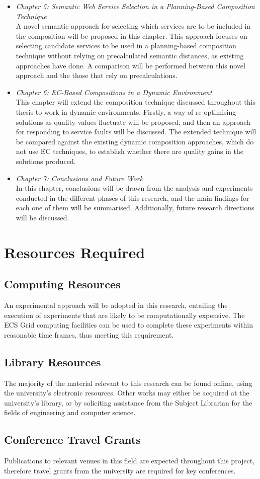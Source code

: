 \begin{itemize}
 \item \textit{Chapter 5: Semantic Web Service Selection in a Planning-Based Composition Technique}\\
 A novel semantic approach for selecting which services are to be included in the composition will be proposed in this chapter. This approach focuses on selecting candidate services to be used in a planning-based composition technique without relying on precalculated semantic distances, as existing approaches have done. A comparison will be performed between this novel approach and the those that rely on precalculations.
 \item \textit{Chapter 6: EC-Based Compositions in a Dynamic Environment}\\
 This chapter will extend the composition technique discussed throughout this thesis to work in dynamic environments. Firstly, a way of re-optimising solutions as quality values fluctuate will be proposed, and then an approach for responding to service faults will be discussed. The extended technique will be compared against the existing dynamic composition approaches, which do not use EC techniques, to establish whether there are quality gains in the solutions produced.
 \item \textit{Chapter 7: Conclusions and Future Work}\\
 In this chapter, conclusions will be drawn from the analysis and experiments conducted in the different phases of this research, and the main findings for each one of them will be summarised. Additionally, future research directions will be discussed.
\end{itemize}


\section{Resources Required}

\subsection{Computing Resources}
An experimental approach will be adopted in this research, entailing the execution of experiments that are likely to be computationally expensive. The ECS Grid computing facilities can be used to complete these experiments within reasonable time frames, thus meeting this requirement.

\subsection{Library Resources}
The majority of the material relevant to this research can be found online, using the university's electronic resources. Other works may either be acquired at the university's library, or by soliciting assistance from the Subject Librarian for the fields of engineering and computer science.

\subsection{Conference Travel Grants}
Publications to relevant venues in this field are expected throughout this project, therefore travel grants from the university are required for key conferences.
